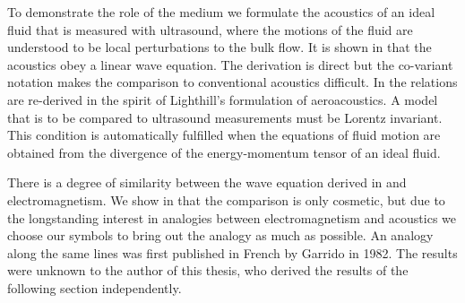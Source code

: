 To demonstrate the role of the medium we formulate the acoustics of  an ideal fluid that is measured with ultrasound,
where the motions of the fluid are  understood to be local perturbations to the bulk flow.
It is shown in  that the acoustics  obey a linear wave equation.
The derivation is direct but the co-variant notation makes the comparison to conventional acoustics difficult.
In  the  relations are re-derived in the spirit of Lighthill's formulation of aeroacoustics.
%
%
A model that is to be compared to ultrasound measurements must be  Lorentz invariant.
This condition is  automatically fulfilled  when the equations of fluid motion are obtained from the  divergence of the energy-momentum tensor of an ideal fluid.


There is a degree of similarity between the wave equation derived in  and electromagnetism.
We show in \secref{} that the comparison is only cosmetic,
but due to the longstanding interest in analogies between electromagnetism and acoustics we
choose our symbols to bring out the analogy as much as possible.
An analogy along the same lines was first published in French by Garrido\cite{Garrido1982} in 1982.
The results were unknown to the author of this thesis, who derived the results of the following section independently.

